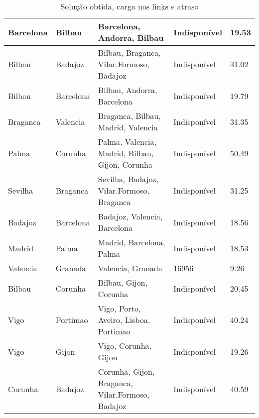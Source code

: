 \begin{table}[!htb]
{\begin{tabular}{|l|l|l|l|l|}
Barcelona & Bilbau & Barcelona, Andorra, Bilbau & Indisponível & 19.53 \\ \hline
Bilbau & Badajoz & Bilbau, Braganca, Vilar.Formoso, Badajoz & Indisponível & 31.02 \\ \hline
Bilbau & Barcelona & Bilbau, Andorra, Barcelona & Indisponível & 19.79 \\ \hline
Braganca & Valencia & Braganca, Bilbau, Madrid, Valencia & Indisponível & 31.35 \\ \hline
Palma & Corunha & Palma, Valencia, Madrid, Bilbau, Gijon, Corunha & Indisponível & 50.49 \\ \hline
Sevilha & Braganca & Sevilha, Badajoz, Vilar.Formoso, Braganca & Indisponível & 31.25 \\ \hline
Badajoz & Barcelona & Badajoz, Valencia, Barcelona & Indisponível & 18.56 \\ \hline
Madrid & Palma & Madrid, Barcelona, Palma & Indisponível & 18.53 \\ \hline
Valencia & Granada & Valencia, Granada & 16956 & 9.26 \\ \hline
Bilbau & Corunha & Bilbau, Gijon, Corunha & Indisponível & 20.45 \\ \hline
Vigo & Portimao & Vigo, Porto, Aveiro, Lisboa, Portimao & Indisponível & 40.24 \\ \hline
Vigo & Gijon & Vigo, Corunha, Gijon & Indisponível & 19.26 \\ \hline
Corunha & Badajoz & Corunha, Gijon, Braganca, Vilar.Formoso, Badajoz & Indisponível & 40.59 \\ \hline
\end{tabular}}
\caption[]{Solução obtida, carga nos links e atraso}
\end{table}

